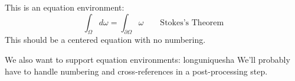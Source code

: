 This is an equation environment:
\[
\int_\Omega d\omega = \int_{\partial\Omega} \omega \qquad\mbox{Stokes's Theorem}
\]
This should be a centered equation with no numbering.

We also want to support equation environments:
longuniquesha
We'll probably have to handle numbering and cross-references in a post-processing step.
